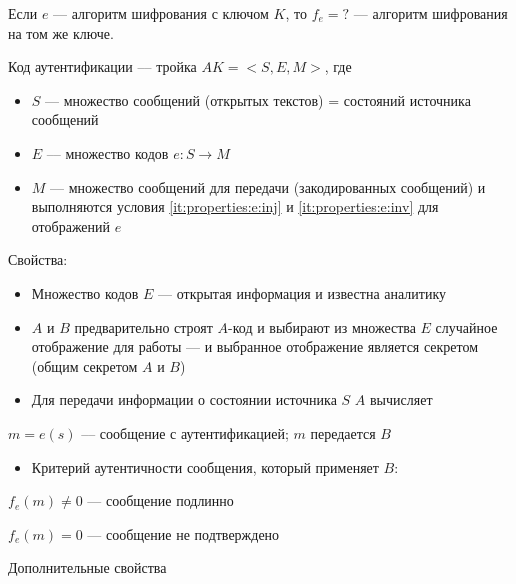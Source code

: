 \begin{example}
  Если $e$ –-- алгоритм шифрования с ключом $K$, то  ${f}_{e} = ?$
  --- алгоритм шифрования на том же ключе.
\end{example}

Код аутентификации --– тройка $AK = <S, E, M>$, где 
\begin{itemize}
  \item
    $S$ --- множество сообщений (открытых текстов) = состояний источника
сообщений
  \item
    $E$ --– множество кодов $e:S\rightarrow M$
  \item
    $M$ --– множество сообщений для передачи (закодированных сообщений) и
    выполняются условия \ref{it:properties:e:inj} и \ref{it:properties:e:inv}
    для отображений $e$
\end{itemize}

 Свойства:

\begin{itemize}
\item Множество кодов $E$ --- открытая информация и известна аналитику
\item $A$ и $B$ предварительно строят $A$-код и выбирают из множества $E$
случайное отображение для работы --- и выбранное отображение является
секретом (общим секретом $A$ и $B$)
\item Для передачи информации о состоянии источника $S$ $A$ вычисляет 
\end{itemize}
$m = e\left( s \right)$ --– сообщение с аутентификацией; $m$ передается $B$ 

\begin{itemize}
\item Критерий аутентичности сообщения, который применяет $B$:
\end{itemize}
 ${f}_{e}\left(m\right){\neq}0$ --- сообщение подлинно

 ${f}_{e}\left(m\right)=0$ --- сообщение не подтверждено

Дополнительные свойства

